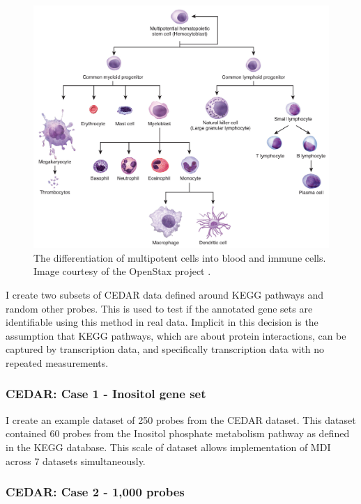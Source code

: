 \documentclass[12pt]{article} %
\begin{document}
	\begin{figure}[h]
		\centering
		\includegraphics[scale=0.75]{Images/white_blood_cell_differentiation.jpg}
		\caption{The differentiation of multipotent cells into blood and immune cells. Image courtesy of the OpenStax project \citep{OpenStaxAnatomyPhysiology2016}.}
		\label{fig:white_blood_cell_differentiation}
	\end{figure}

	 I create two subsets of CEDAR data defined around KEGG pathways and random other probes. This is used to test if the annotated gene sets are identifiable using this method in real data. Implicit in this decision is the assumption that KEGG pathways, which are about protein interactions, can be captured by transcription data, and specifically transcription data with no repeated measurements. 
	 

	 

	\subsubsection{CEDAR: Case 1 - Inositol gene set} \label{sec:case_studies:cedar:dataset_1}

	I create an example dataset of 250 probes from the CEDAR dataset. This dataset contained 60 probes from the Inositol phosphate metabolism pathway as defined in the KEGG database. This scale of dataset allows implementation of MDI across 7 datasets simultaneously.
	
	\subsubsection{CEDAR: Case 2 - 1,000 probes} \label{sec:case_studies:cedar:dataset_2}
	
\end{document}

